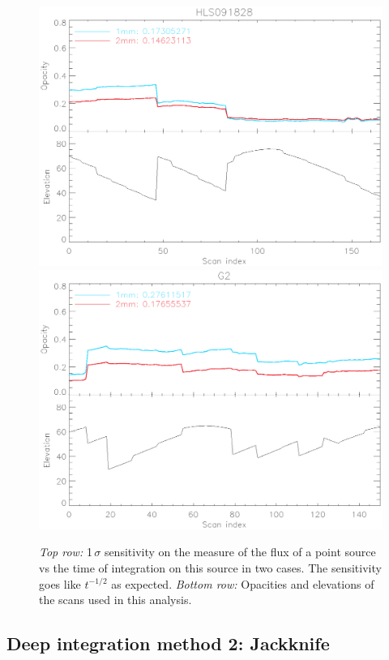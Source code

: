 \begin{figure}
\begin{center}
\includegraphics[clip, angle=0, scale =0.4]{Figures/hls_opacity_and_elev.eps}
\includegraphics[clip, angle=0, scale =0.4]{Figures/g2_opacity_and_elev.eps}
\caption[NEFD vs time]{\emph{Top row:} 1\,$\sigma$ sensitivity on the
  measure of the flux of a point source vs the time of integration on this
  source in two cases. The sensitivity goes like $t^{-1/2}$ as
  expected. \emph{Bottom row:} Opacities and elevations of the scans used in
  this analysis.}
\label{fig:nefd_plots}
\end{center}
\end{figure}

\subsection{Deep integration method 2: Jackknife}

